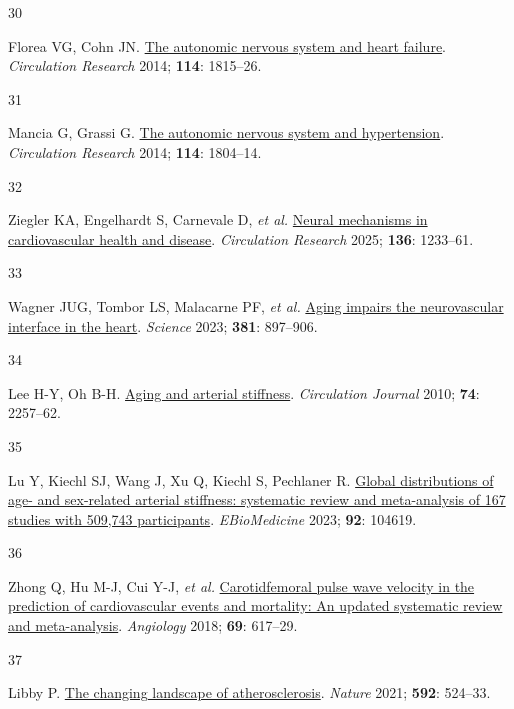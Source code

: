\documentclass[
  a4paper,
  headsepline=true,
  open=left]{scrbook}
\newlength{\cslhangindent}
\newlength{\csllabelwidth}
\newlength{\cslentryspacingunit} %
\newenvironment{CSLReferences}[2] %
 {%
  \setlength{\parindent}{0pt}
  \ifodd #1
  \let\oldpar\par
  \def\par{\hangindent=\cslhangindent\oldpar}
  \fi
  \setlength{\parskip}{#2\cslentryspacingunit}
 }%
 {}
\newcommand{\CSLLeftMargin}[1]{\parbox[t]{\csllabelwidth}{#1}}
\newcommand{\CSLRightInline}[1]{\parbox[t]{\linewidth - \csllabelwidth}{#1}\break}
\begin{document}
\begin{CSLReferences}{0}{0}
\leavevmode{}%
\CSLLeftMargin{30 }%
\CSLRightInline{Florea VG, Cohn JN.
\href{https://doi.org/10.1161/CIRCRESAHA.114.302589}{The autonomic
nervous system and heart failure}. \emph{Circulation Research} 2014;
\textbf{114}: 1815--26.}

\leavevmode{}%
\CSLLeftMargin{31 }%
\CSLRightInline{Mancia G, Grassi G.
\href{https://doi.org/10.1161/CIRCRESAHA.114.302524}{The autonomic
nervous system and hypertension}. \emph{Circulation Research} 2014;
\textbf{114}: 1804--14.}

\leavevmode{}%
\CSLLeftMargin{32 }%
\CSLRightInline{Ziegler KA, Engelhardt S, Carnevale D, \emph{et al.}
\href{https://doi.org/10.1161/CIRCRESAHA.125.325580}{Neural mechanisms
in cardiovascular health and disease}. \emph{Circulation Research} 2025;
\textbf{136}: 1233--61.}

\leavevmode{}%
\CSLLeftMargin{33 }%
\CSLRightInline{Wagner JUG, Tombor LS, Malacarne PF, \emph{et al.}
\href{https://doi.org/10.1126/science.ade4961}{Aging impairs the
neurovascular interface in the heart}. \emph{Science} 2023;
\textbf{381}: 897--906.}

\leavevmode{}%
\CSLLeftMargin{34 }%
\CSLRightInline{Lee H-Y, Oh B-H.
\href{https://doi.org/10.1253/circj.CJ-10-0910}{Aging and arterial
stiffness}. \emph{Circulation Journal} 2010; \textbf{74}: 2257--62.}

\leavevmode{}%
\CSLLeftMargin{35 }%
\CSLRightInline{Lu Y, Kiechl SJ, Wang J, Xu Q, Kiechl S, Pechlaner R.
\href{https://doi.org/10.1016/j.ebiom.2023.104619}{Global distributions
of age- and sex-related arterial stiffness: systematic review and
meta-analysis of 167 studies with 509,743 participants}.
\emph{EBioMedicine} 2023; \textbf{92}: 104619.}

\leavevmode{}%
\CSLLeftMargin{36 }%
\CSLRightInline{Zhong Q, Hu M-J, Cui Y-J, \emph{et al.}
\href{https://doi.org/10.1177/0003319717742544}{Carotid{\textendash}femoral
pulse wave velocity in the prediction of cardiovascular events and
mortality: An updated systematic review and meta-analysis}.
\emph{Angiology} 2018; \textbf{69}: 617--29.}

\leavevmode{}%
\CSLLeftMargin{37 }%
\CSLRightInline{Libby P.
\href{https://doi.org/10.1038/s41586-021-03392-8}{The changing landscape
of atherosclerosis}. \emph{Nature} 2021; \textbf{592}: 524--33.}


\end{CSLReferences}
\end{document}
